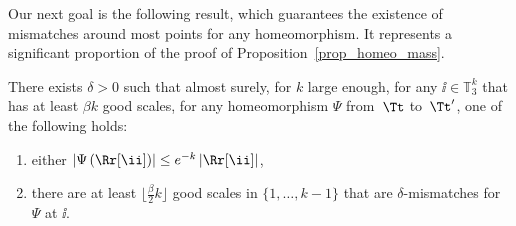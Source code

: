 Our next goal is the following result, which guarantees the existence of mismatches around most points for any homeomorphism.
It represents a significant proportion of the proof of Proposition~\ref{prop_homeo_mass}.
\begin{proposition}\label{prop_existence_mismatches}
There exists $\delta>0$ such that almost surely, for $k$ large enough, for any $\ii \in \mathbb{T}_3^k$ that has at least $\beta k$ good scales, for any homeomorphism $\Psi$ from~$\Tt$ to~$\Tt'$, one of the following holds:
\begin{enumerate}
\item \label{it:prop:image region is small} either $\left| \Psi \left( \Rr[\ii] \right) \right| \leq e^{-k} \left| \Rr[\ii] \right|$,
\item\label{it:prop:many mismatches} there are at least $\lfloor\frac{\beta}{2} k \rfloor$ good scales in $\{1,\dots,k-1\}$ that are $\delta$-mismatches for $\Psi$ at $\ii$.
\end{enumerate}
\end{proposition}
